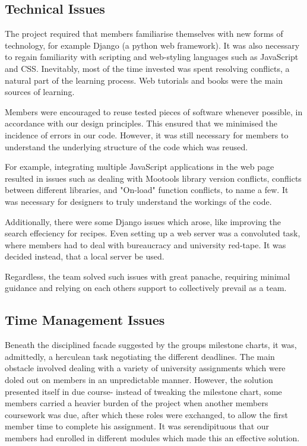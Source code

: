 \subsection{Technical Issues}

The project required that members familiarise themselves with new forms of technology, for example Django (a python web framework). It was also necessary to regain familiarity with scripting and web-styling languages such as JavaScript and CSS. Inevitably, most of the time invested was spent resolving conflicts, a natural part of the learning process. Web tutorials and books were the main sources of learning.

Members were encouraged to reuse tested pieces of software whenever possible, in accordance with our design principles. This ensured that we minimised the incidence of errors in our code. However, it was still necessary for members to understand the underlying structure of the code which was reused.

For example, integrating multiple JavaScript applications in the web page resulted in issues such as dealing with Mootools library version conflicts, conflicts between different libraries, and "On-load" function conflicts, to name a few. It was necessary for designers to truly understand the workings of the code.

Additionally, there were some Django issues which arose, like improving the search effeciency for recipes. Even setting up a web server was a convoluted task, where members had to deal with bureaucracy and university red-tape. It was decided instead, that a local server be used.

Regardless, the team solved such issues with great panache, requiring minimal guidance and relying on each others support to collectively prevail as a team.

\subsection{Time Management Issues}

Beneath the disciplined facade suggested by the groups milestone charts, it was, admittedly, a herculean task negotiating the different deadlines. The main obstacle involved dealing with a variety of university assignments which were doled out on members in an unpredictable manner. However, the solution presented itself in due course- instead of tweaking the milestone chart, some members carried a heavier burden of the project when another members coursework was due, after which these roles were exchanged, to allow the first member time to complete his assignment. It was serendipituous that our members had enrolled in different modules which made this an effective solution.

